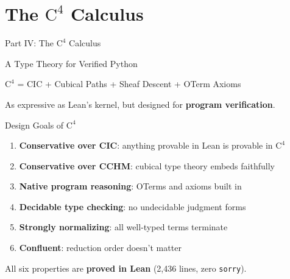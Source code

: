 \documentclass[aspectratio=169,11pt]{beamer}
\newcommand{\Cfour}{\mathrm{C}^4}
\begin{document}

\part{The $\Cfour$ Calculus}

\begin{frame}{Part IV: The $\Cfour$ Calculus}
\begin{center}
{\Large\color{blue} A Type Theory for Verified Python}

\vspace{1em}
$\Cfour$ = CIC + Cubical Paths + Sheaf Descent + OTerm Axioms

\vspace{1em}
As expressive as Lean's kernel, but designed for \textbf{program verification}.
\end{center}
\end{frame}

\begin{frame}{Design Goals of $\Cfour$}
\begin{enumerate}
\item \textbf{Conservative over CIC}: anything provable in Lean is provable in $\Cfour$
\item \textbf{Conservative over CCHM}: cubical type theory embeds faithfully
\item \textbf{Native program reasoning}: OTerms and axioms built in
\item \textbf{Decidable type checking}: no undecidable judgment forms
\item \textbf{Strongly normalizing}: all well-typed terms terminate
\item \textbf{Confluent}: reduction order doesn't matter
\end{enumerate}

\vspace{0.5em}
All six properties are \textbf{proved in Lean} (2,436 lines, zero \texttt{sorry}).
\end{frame}
\end{document}
